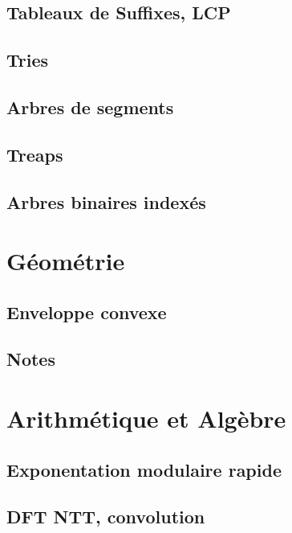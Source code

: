 \documentclass[10pt]{article}
\begin{document}
\subsection{Tableaux de Suffixes, LCP}
{\scriptsize}

\subsection{Tries}
{\scriptsize}

\subsection{Arbres de segments}
{\scriptsize}

\subsection{Treaps}
{\scriptsize}

\subsection{Arbres binaires indexés}
{\scriptsize}


\section{Géométrie}
\subsection{Enveloppe convexe}
{\scriptsize}

\subsection{Notes}



\section{Arithmétique et Algèbre}
\subsection{Exponentation modulaire rapide}
{\scriptsize}

\subsection{DFT NTT, convolution}
{\scriptsize}
\end{document}
